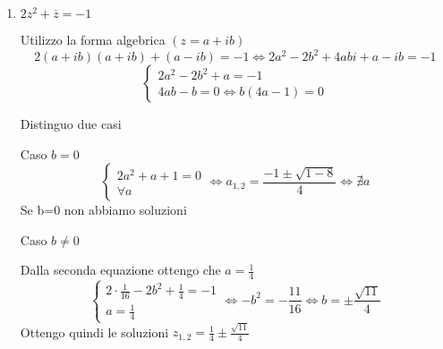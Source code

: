 \documentclass{article}
\begin{document}
\begin{enumerate}[label=\textbf{Esercizio 3.\arabic*.},itemindent=*]
\begin{enumerate}
        \item $2z^2+\overline{z}=-1$
        \par Utilizzo la forma algebrica $(z=a+ib)$
        \[2(a+ib)(a+ib)+(a-ib)=-1\Leftrightarrow 2a^2-2b^2+4abi+a-ib=-1\]
        \[\begin{cases}
        2a^2-2b^2+a=-1 \\ 4ab-b=0\Leftrightarrow b(4a-1)=0
        \end{cases}\]
        
        Distinguo due casi
        
        Caso $b=0$
        \[\begin{cases}
        2a^2+a+1=0 \\ \forall a
        \end{cases} \Leftrightarrow a_{1,2}=\frac{-1\pm\sqrt{1-8}}{4}\Leftrightarrow\nexists a\]
         Se b=0 non abbiamo soluzioni
        
        \par Caso $b\neq0$
        \par Dalla seconda equazione ottengo che $a=\frac{1}{4}$
        \[\begin{cases}
        2\cdot{\frac{1}{16}}-2b^2+\frac{1}{4}=-1 \\ a=\frac{1}{4}
        \end{cases}\Leftrightarrow -b^2=-\frac{11}{16}\Leftrightarrow b=\pm \frac{\sqrt{11}}{4}\]
         Ottengo quindi le soluzioni $z_{1,2}=\frac{1}{4}\pm\frac{\sqrt{11}}{4}$
    
    \end{enumerate}
    

\end{enumerate}
\end{document}
